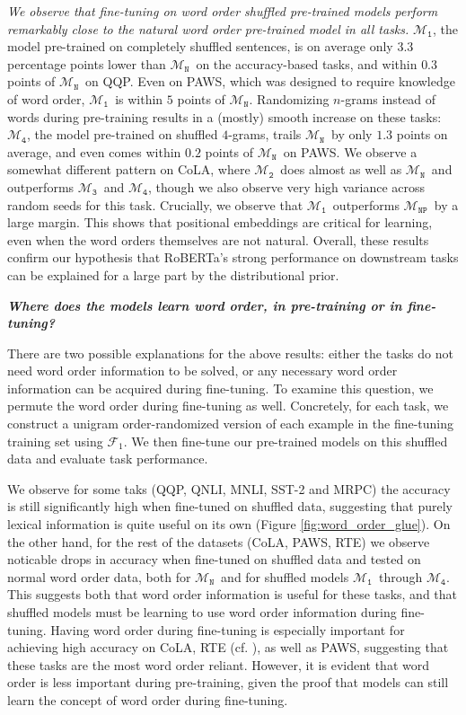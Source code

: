 \documentclass[12pt]{article}
\newcommand{\xit}[1]{{\noindent\textbf{\textit{#1}}}}
\newcommand{\OR}{$\mathcal{M}_{\texttt{N}}$}
\newcommand{\RI}{$\mathcal{M}_{\texttt{1}}$}
\newcommand{\RII}{$\mathcal{M}_{\texttt{2}}$}
\newcommand{\RIII}{$\mathcal{M}_{\texttt{3}}$}
\newcommand{\RIV}{$\mathcal{M}_{\texttt{4}}$}
\newcommand{\NP}{$\mathcal{M}_{\texttt{NP}}$}
\begin{document}
\textit{We observe that fine-tuning on word order shuffled pre-trained models perform remarkably close to the natural word order pre-trained model in all tasks.} \RI, the model pre-trained on completely shuffled sentences, is on average only $3.3$ percentage points lower than \OR\ on the accuracy-based tasks,
and within $0.3$ points of \OR\ on QQP.
Even on PAWS, which was designed to require knowledge of word order, \RI\ is within $5$ points of \OR.
Randomizing $n$-grams instead of words during pre-training results in a (mostly) smooth increase on these tasks: \RIV, the model pre-trained on shuffled $4$-grams, trails \OR\ by only $1.3$ points on average, and even comes within $0.2$ points of \OR\ on PAWS. We observe a somewhat different pattern on CoLA, where \RII\ does almost as well as \OR\ and outperforms \RIII\ and \RIV, though we also observe very high variance across random seeds for this task.
Crucially, we observe that \RI\ outperforms \NP\ by a large margin. This shows that positional embeddings are critical for learning, even when the word orders themselves are not natural.
Overall, these results confirm our hypothesis that RoBERTa's strong performance on downstream tasks can be explained for a large part by the distributional prior.


\xit{Where does the models learn word order, in pre-training or in fine-tuning?}


There are two possible explanations for the above results: either the tasks do not need word order information to be solved, or any necessary word order information can be acquired during fine-tuning.
To examine this question, we permute the word order during fine-tuning as well. Concretely, for each task, we construct a unigram order-randomized version of each example in the fine-tuning training set using $\mathcal{F}_1$. We then fine-tune our pre-trained models on this shuffled data and evaluate task performance.

We observe for some taks (QQP, QNLI, MNLI, SST-2 and MRPC) the accuracy is still significantly high when fine-tuned on shuffled data, suggesting that purely lexical information is quite useful on its own (Figure \ref{fig:word_order_glue}). On the other hand, for the rest of the datasets (CoLA, PAWS, RTE) we observe noticable drops in accuracy when fine-tuned on shuffled data and tested on normal word order data, both for \OR\ and for shuffled models \RI\ through \RIV.
This suggests both that word order information is useful for these tasks, and that shuffled models must be learning to use word order information during fine-tuning. Having word order during fine-tuning is especially important for achieving high accuracy on CoLA, RTE (cf. \cite{pham2020}), as well as PAWS,
suggesting that these tasks are the most word order reliant. However, it is evident that word order is less important during pre-training, given the proof that models can still learn the concept of word order during fine-tuning.
\end{document}
